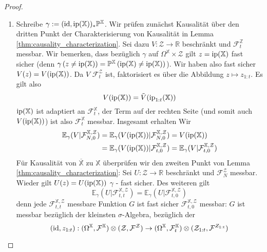 \begin{proof}
\begin{enumerate}
\item Schreibe $\gamma:=(\operatorname{id}, \operatorname{ip}(\mathbb{X}))_* \mathbb{P}^\mathbb{X}$. Wir prüfen zunächst Kausalität über den dritten Punkt der Charakterisierung von Kausalität in Lemma \ref{thm:causality_characterization}. Sei dazu $V: \mathcal{Z}\rightarrow\mathbb{R}$ beschränkt und $\mathcal{F}_t^\mathbb{Z}$ messbar. Wir bemerken, dass bezüglich $\gamma$ auf $\Omega^\mathbb{X} \times \mathcal{Z}$ gilt $z=\operatorname{ip}(\mathbb{X})$ fast sicher (denn $\gamma\left(z \neq \operatorname{ip}(\mathbb{X})\right) = \mathbb{P}^\mathbb{X}\left(\operatorname{ip}(\mathbb{X}) \neq \operatorname{ip}(\mathbb{X})\right)$). Wir haben also fast sicher $V(z) = V(\operatorname{ip}(\mathbb{X}))$. Da $V$ $\mathcal{F}_t^\mathcal{Z}$ ist, faktorisiert es über die Abbildung $z \mapsto z_{1:t}$. Es gilt also
$$V(\operatorname{ip}(\mathbb{X})) = \tilde{V}(\operatorname{ip}_{1:t}(\mathbb{X}))$$
$\operatorname{ip}(\mathbb{X})$ ist adaptiert an $\mathcal{F}_t^\mathbb{X}$, der Term auf der rechten Seite (und somit auch $V(\operatorname{ip}(\mathbb{X}))$) ist also $\mathcal{F}_t^\mathbb{X}$ messbar. Insgesamt erhalten Wir
\begin{align*}
    \mathbb{E}_\gamma(V \vert \mathcal{F}_{N, 0}^{\mathbb{X}, \mathcal{Z}}) &= \mathbb{E}_\gamma(V(\operatorname{ip}(\mathbb{X}))\vert \mathcal{F}_{N, 0}^{\mathbb{X}, \mathcal{Z}}) = V(\operatorname{ip}(\mathbb{X})) \\
    &= \mathbb{E}_\gamma(V(\operatorname{ip}(\mathbb{X})) \vert \mathcal{F}_{t, 0}^{\mathbb{X}, \mathcal{Z}}) = \mathbb{E}_\gamma(V \vert \mathcal{F}_{t, 0}^{\mathbb{X}, \mathcal{Z}})
\end{align*}
Für Kausalität von $\overline{\mathbb{X}}$ zu $\mathbb{X}$ überprüfen wir den zweiten Punkt von Lemma \ref{thm:causality_characterization}: Sei $U: \mathcal{Z}\rightarrow \mathbb{R}$ beschränkt und $\mathcal{F}_N^\mathcal{Z}$ messbar. Wieder gilt $U(z) = U(\operatorname{ip}(\mathbb{X}))$ $\gamma$ - fast sicher. Des weiteren gilt
\begin{equation}\label{eq:39i_1}
\mathbb{E}_\gamma(U \vert \mathcal{F}_{t,t}^{\mathbb{X}, \mathcal{Z}}) = \mathbb{E}_\gamma(U \vert \mathcal{F}_{t, 0}^{\mathbb{X}, \mathcal{Z}})
\end{equation}
denn jede $\mathcal{F}_{t,t}^{\mathbb{X}, \mathcal{Z}}$ messbare Funktion $G$ ist fast sicher $\mathcal{F}_{t, 0}^{\mathbb{X}, \mathcal{Z}}$ messbar: $G$ ist messbar bezüglich der kleinsten $\sigma$-Algebra, bezüglich der 
$$(\operatorname{id}, z_{1:t}): (\Omega^\mathbb{X}, \mathcal{F}^\mathbb{X})\otimes (\mathcal{Z}, \mathcal{F}^{\mathcal{Z}}) \rightarrow (\Omega^\mathbb{X}, \mathcal{F}_t^\mathbb{X}) \otimes (\mathcal{Z}_{1:t}, \mathcal{F}^{Z_{1:t}})$$

\end{enumerate}
\end{proof}
